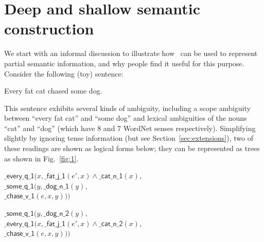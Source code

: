 \newcommand{\sem}[1]{\mathsf{#1}}
\newcommand{\sempred}[1]{\mathrm{#1}}

\section{Deep and shallow semantic construction}
\label{sec:motivation}

We start with an informal discussion to 
illustrate how \rmrs\ can be used to represent partial
semantic information, and why people find it useful for this purpose.
Consider the following (toy) sentence:
\begin{examples}
  \item Every fat cat chased some dog.
\end{examples}

This sentence exhibits several kinds of ambiguity, including a scope
ambiguity between ``every fat cat'' and ``some dog'' and lexical
ambiguities of the nouns ``cat'' and ``dog'' (which have 8 and 7 
WordNet senses respectively).  Simplifying slightly by
ignoring tense information (but see
Section~\ref{sec:extensions}), two of these readings are
shown as logical forms below; they can be represented as trees as
shown in Fig.~\ref{fig:1}.  

\begin{examples}
\item $\sem{\_every\_q\_1}(x, \sem{\_fat\_j\_1}(e',x) \wedge
    \sem{\_cat\_n\_1}(x),$\\
\hspace*{0.1in} $\sem{\_some\_q\_1}(y, \sem{\_dog\_n\_1}(y),$\\
\hspace*{0.2in}$\sem{\_chase\_v\_1}(e,x,y)))$
\label{ex:fat-cat-1}
\item $\sem{\_some\_q\_1}(y, \sem{\_dog\_n\_2}(y),$\\
\hspace*{0.1in}$\sem{\_every\_q\_1}(x, \sem{\_fat\_j\_1}(e',x) \wedge
    \sem{\_cat\_n\_2}(x), $\\
\hspace*{0.2in}$\sem{\_chase\_v\_1}(e,x,y)))$
\label{ex:fat-cat-2}
\end{examples}


